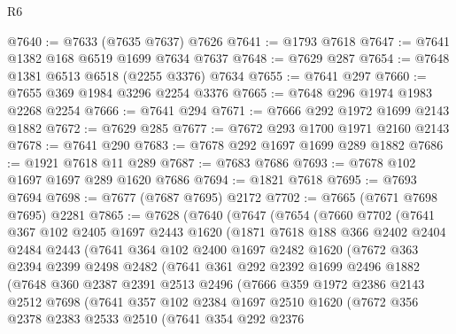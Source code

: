 \begin{lexlean}{R6}
\begin{coremodule}
@7640 := @7633 (@7635 @7637) @7626
@7641 := @1793 @7618
@7647 := @7641 @1382 @168 @6519 @1699 @7634 @7637
@7648 := @7629 @287
@7654 := @7648 @1381 @6513 @6518 (@2255 @3376) @7634
@7655 := @7641 @297
@7660 := @7655 @369 @1984 @3296 @2254 @3376
@7665 := @7648 @296 @1974 @1983 @2268 @2254
@7666 := @7641 @294
@7671 := @7666 @292 @1972 @1699 @2143 @1882
@7672 := @7629 @285
@7677 := @7672 @293 @1700 @1971 @2160 @2143
@7678 := @7641 @290
@7683 := @7678 @292 @1697 @1699 @289 @1882
@7686 := @1921 @7618 @11 @289
@7687 := @7683 @7686
@7693 := @7678 @102 @1697 @1697 @289 @1620 @7686
@7694 := @1821 @7618
@7695 := @7693 @7694
@7698 := @7677 (@7687 @7695) @2172
@7702 := @7665 (@7671 @7698 @7695) @2281
@7865 := @7628
    (@7640
      (@7647
        (@7654
          (@7660
            @7702
            (@7641
              @367
              @102
              @2405
              @1697
              @2443
              @1620
              (@1871
                @7618
                @188
                @366
                @2402
                @2404
                @2484
                @2443
                (@7641
                  @364
                  @102
                  @2400
                  @1697
                  @2482
                  @1620
                  (@7672
                    @363
                    @2394
                    @2399
                    @2498
                    @2482
                    (@7641
                      @361
                      @292
                      @2392
                      @1699
                      @2496
                      @1882
                      (@7648
                        @360
                        @2387
                        @2391
                        @2513
                        @2496
                        (@7666
                          @359
                          @1972
                          @2386
                          @2143
                          @2512
                          @7698
                          (@7641
                            @357
                            @102
                            @2384
                            @1697
                            @2510
                            @1620
                            (@7672
                              @356
                              @2378
                              @2383
                              @2533
                              @2510
                              (@7641
                                @354
                                @292
                                @2376

\end{coremodule}
\end{lexlean}
